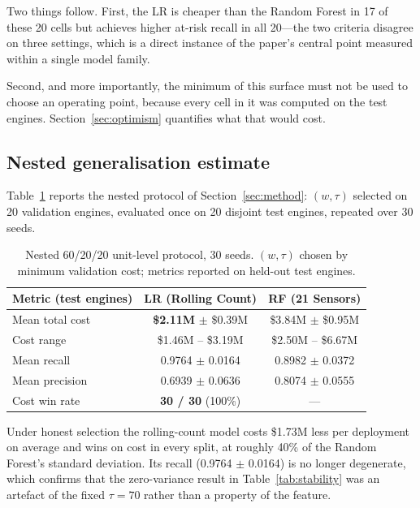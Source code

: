 \documentclass[10pt,twocolumn]{article}
\begin{document}
Two things follow. First, the LR is cheaper than the Random Forest in 17 of these 20
cells but achieves higher at-risk recall in all 20---the two criteria disagree on three
settings, which is a direct instance of the paper's central point measured within a
single model family.

Second, and more importantly, the minimum of this surface must not be used to choose an
operating point, because every cell in it was computed on the test engines.
Section~\ref{sec:optimism} quantifies what that would cost.

\subsection{Nested generalisation estimate}
\label{sec:nested}

Table~\ref{tab:nested} reports the nested protocol of Section~\ref{sec:method}:
$(w,\tau)$ selected on 20 validation engines, evaluated once on 20 disjoint test
engines, repeated over 30 seeds.

\begin{table}[h]
\centering
\caption{Nested 60/20/20 unit-level protocol, 30 seeds. $(w,\tau)$ chosen by minimum
validation cost; metrics reported on held-out test engines.}
\label{tab:nested}
\vspace{4pt}
\small
\begin{tabular}{lcc}
\toprule
Metric (test engines) & LR (Rolling Count) & RF (21 Sensors) \\
\midrule
Mean total cost & \textbf{\$2.11M} $\pm$ \$0.39M & \$3.84M $\pm$ \$0.95M \\
Cost range & \$1.46M -- \$3.19M & \$2.50M -- \$6.67M \\
Mean recall & 0.9764 $\pm$ 0.0164 & 0.8982 $\pm$ 0.0372 \\
Mean precision & 0.6939 $\pm$ 0.0636 & 0.8074 $\pm$ 0.0555 \\
Cost win rate & \textbf{30 / 30} (100\%) & --- \\
\bottomrule
\end{tabular}
\end{table}

Under honest selection the rolling-count model costs \$1.73M less per deployment on
average and wins on cost in every split, at roughly 40\% of the Random Forest's
standard deviation. Its recall (0.9764 $\pm$ 0.0164) is no longer degenerate, which
confirms that the zero-variance result in Table~\ref{tab:stability} was an artefact of
the fixed $\tau=70$ rather than a property of the feature.
\end{document}
